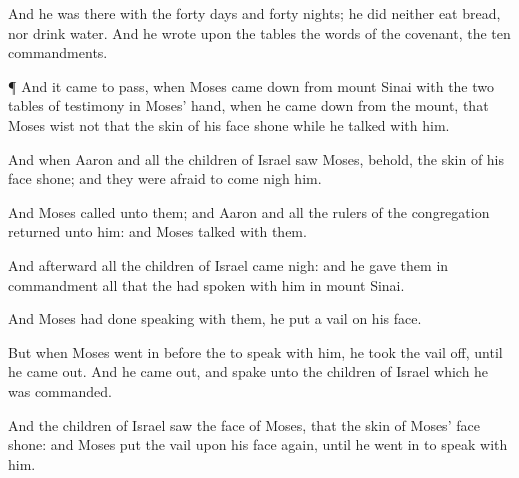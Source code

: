 {\par }{\PP {}And he was there with the
{}
forty
days and
forty
nights; he did neither
eat
bread, nor
drink
water. And he
wrote upon the
tables the
words of the
covenant, the
ten
commandments.


\par }{\PP {}¶ And it came to pass, when
Moses came
down from
mount
Sinai with the
two
tables of
testimony in
Moses’
hand, when he came
down from the
mount, that
Moses
wist not that the
skin of his
face
shone while he
talked with him.

And when
Aaron and all the
children of
Israel
saw
Moses, behold, the
skin of his
face
shone; and they were
afraid to come
nigh him.

And
Moses
called unto them; and
Aaron and all the
rulers of the
congregation
returned unto him: and
Moses
talked with them.

And
afterward all the
children of
Israel came
nigh: and he gave them in
commandment all that the
{} had
spoken with him in
mount
Sinai.

And
{}
Moses had
done
speaking with them, he
put a
vail on his
face.

But when
Moses went
in
before the
{} to
speak with him, he
took the
vail
off, until he came
out. And he came
out, and
spake unto the
children of
Israel
{} which he was
commanded.

And the
children of
Israel
saw the
face of
Moses, that the
skin of
Moses’
face
shone: and
Moses
put the
vail upon his
face
again, until he
went in to
speak with him.




\par }
